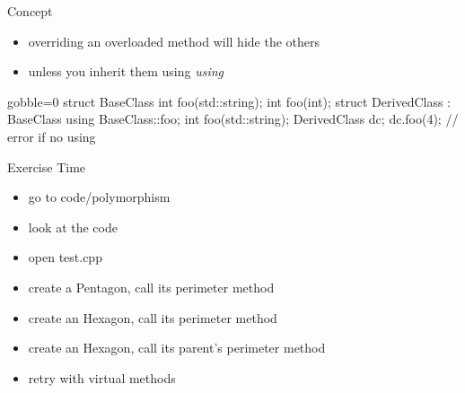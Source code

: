 \begin{frame}[fragile]
  \begin{block}{Concept}
    \begin{itemize}
    \item overriding an overloaded method will hide the others
    \item unless you inherit them using {\it using}
    \end{itemize}
  \end{block}
  \begin{cppcode*}{gobble=0}
    struct BaseClass {
      int foo(std::string);
      int foo(int);
    }
    struct DerivedClass : BaseClass {
      using BaseClass::foo;
      int foo(std::string);
    }
    DerivedClass dc;
    dc.foo(4);      // error if no using
    \end{cppcode*}
\end{frame}

\begin{frame}[fragile]
  \begin{alertblock}{Exercise Time}
    \begin{itemize}
    \item go to code/polymorphism
    \item look at the code
    \item open test.cpp
    \item create a Pentagon, call its perimeter method
    \item create an Hexagon, call its perimeter method
    \item create an Hexagon, call its parent's perimeter method
    \item retry with virtual methods
    \end{itemize}
  \end{alertblock}
\end{frame}

